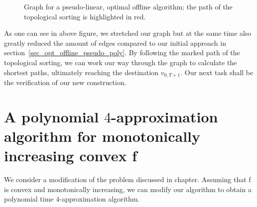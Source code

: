 \documentclass[hidelinks]{article}
\theoremstyle{plain}
\theoremstyle{definition}
\theoremstyle{rem}
\begin{document}
\begin{figure}[H]
{
}
\caption{Graph for a pseudo-linear, optimal offline algorithm; the path of the topological sorting is highlighted in red.}
\label{fig_graph_pseudo_lin}
\end{figure}
As one can see in above figure, we stretched our graph but at the same time also greatly reduced the amount of edges compared to our initial approach in section~\ref{sec_opt_offline_pseudo_poly}. By following the marked path of the topological sorting, we can work our way through the graph to calculate the shortest paths, ultimately reaching the destination $v_{0,T+1}$. Our next task shall be the verification of our new construction.

\section{A polynomial $4$-approximation algorithm for monotonically increasing convex f}
We consider a modification of the problem discussed in chapter. Assuming that f is convex and monotonically increasing, we can modify our algorithm to obtain a polynomial time $4$-approximation algorithm.
\end{document}
